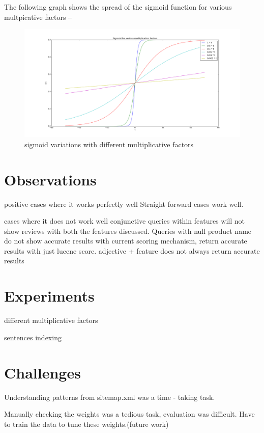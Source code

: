 \documentclass{article}
\begin{document}
The following graph shows the spread of the sigmoid function for various multpicative factors --
\begin{figure}[ht!]
  \centering
  \includegraphics[width=1\textwidth]{sigmoidVariations}
  \caption{sigmoid variations with different multiplicative factors\label{fig:sigmoid}}
\end{figure}

\section{Observations}
\begin{description}
\item positive cases where it works perfectly well
Straight forward cases work well.
\item cases where it does not work well
conjunctive queries within features will not show reviews with both the features discussed.
Queries with null product name do not show accurate results with current scoring mechanism, return accurate results with just lucene score.
adjective + feature does not always return accurate results
\end{description}

\section{Experiments}
\begin{description}
\item different multiplicative factors
\item sentences indexing
\end{description}

\section{Challenges}
\begin{description}
\item Understanding patterns from sitemap.xml was a time - taking task.
\item Manually checking the weights was a tedious task, evaluation was difficult. Have to train the data to tune these weights.(future work)
\end{description}
\end{document}
